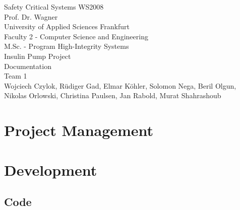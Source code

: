 \documentclass[pdflatex,a4paper,11pt,english]{scrreprt}
\begin{document}
\begin{titlepage}
\vspace*{4cm}
\begin{center}
\Large
Safety Critical Systems WS2008\\
Prof. Dr. Wagner\\
\vspace{4cm}
\normalsize
University of Applied Sciences Frankfurt\\
Faculty 2 - Computer Science and Engineering\\
M.Sc. - Program High-Integrity Systems\\
\vspace{2cm}
Insulin Pump Project\\
Documentation\\
Team 1\\
\vspace{2cm}
Wojciech Czylok, Rüdiger Gad, Elmar Köhler, Solomon Nega, Beril Olgun,\\
Nikolas Orlowski, Christina Paulsen, Jan Rabold, Murat Shahrashoub
\end{center}
\end{titlepage}

\tableofcontents

\listoffigures


\newpage
\chapter{Project Management}


\chapter{Development}




\newpage


\newpage


\section{Code}



        
\end{document}
